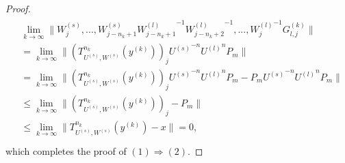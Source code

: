 \documentclass[10pt,a4paper]{amsart}
\begin{document}
\begin{proof}
\begin{eqnarray}\begin{split}\nonumber
&\lim_{k\rightarrow\infty}\|W^{(s)}_{j},...,W^{(s)}_{j-n_{k}+1}{W^{(l)}_{j-n_{k}+1}}^{-1}{W^{(l)}_{j-n_{k}+2}}^{-1},...,
{W^{(l)}_{j}}^{-1}G^{(k)}_{l,j}\|\\
&=\lim_{k\rightarrow\infty}\|\left(T^{n_{k}}_{U^{(s)},W^{(s)}}(y^{(k)})\right)_{j} {U^{(s)}}^{-n}{U^{(l)}}^{n}P_{m}\|\\
&=\lim_{k\rightarrow\infty}\|\left(T^{n_{k}}_{U^{(s)},W^{(s)}}(y^{(k)})\right)_{j} {U^{(s)}}^{-n}{U^{(l)}}^{n}P_{m}-P_{m}{U^{(s)}}^{-n}{U^{(l)}}^{n}P_{m}\|\\
&\leq\lim_{k\rightarrow\infty}\|\left(T^{n_{k}}_{U^{(s)},W^{(s)}}(y^{(k)})\right)_{j}-P_{m}\|\\
&\leq \lim_{k\rightarrow\infty}\|T^{n_{k}}_{U^{(s)},W^{(s)}}(y^{(k)})-x\|=0,\\
\end{split}\end{eqnarray}
which completes the proof of $(1)\Rightarrow(2)$.


\end{proof}
\end{document}
